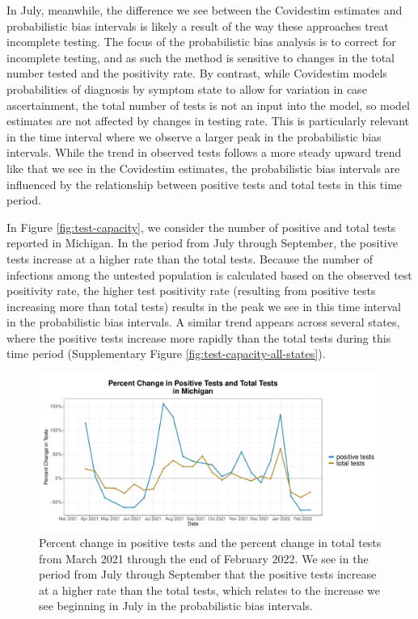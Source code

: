 \documentclass[12pt,twoside]{smiththesis}
\begin{document}
In July, meanwhile, the difference we see between the Covidestim estimates and probabilistic bias intervals is likely a result of the way these approaches treat incomplete testing. The focus of the probabilistic bias analysis is to correct for incomplete testing, and as such the method is sensitive to changes in the total number tested and the positivity rate. By contrast, while Covidestim models probabilities of diagnosis by symptom state to allow for variation in case ascertainment, the total number of tests is not an input into the model, so model estimates are not affected by changes in testing rate. This is particularly relevant in the time interval where we observe a larger peak in the probabilistic bias intervals. While the trend in observed tests follows a more steady upward trend like that we see in the Covidestim estimates, the probabilistic bias intervals are influenced by the relationship between positive tests and total tests in this time period.

In Figure \ref{fig:test-capacity}, we consider the number of positive and total tests reported in Michigan. In the period from July through September, the positive tests increase at a higher rate than the total tests. Because the number of infections among the untested population is calculated based on the observed test positivity rate, the higher test positivity rate (resulting from positive tests increasing more than total tests) results in the peak we see in this time interval in the probabilistic bias intervals. A similar trend appears across several states, where the positive tests increase more rapidly than the total tests during this time period (Supplementary Figure \ref{fig:test-capacity-all-states}).
\begin{figure}
\includegraphics[width=1\linewidth]{figure/test_capacity} \caption{\label{fig:test-capacity} Percent change in positive tests and the percent change in total tests from March 2021 through the end of February 2022. We see in the period from July through September that the positive tests increase at a higher rate than the total tests, which relates to the increase we see beginning in July in the probabilistic bias intervals.}\label{fig:unnamed-chunk-68}
\end{figure}
\newpage
\end{document}
